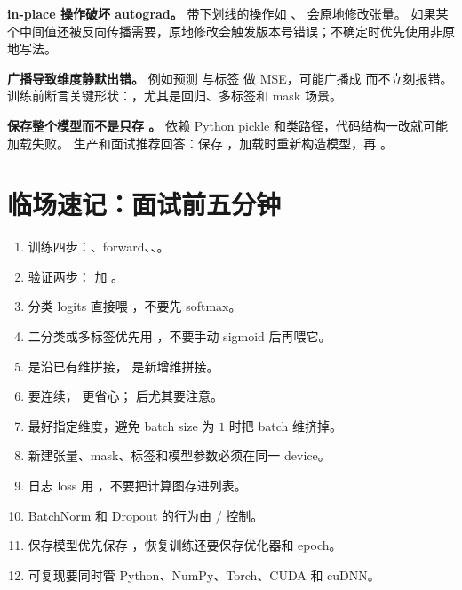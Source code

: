 \begin{trap}
\textbf{in-place 操作破坏 autograd。}
带下划线的操作如 、 会原地修改张量。
如果某个中间值还被反向传播需要，原地修改会触发版本号错误；不确定时优先使用非原地写法。
\end{trap}

\begin{trap}
\textbf{广播导致维度静默出错。}
例如预测 \code{[N,1]} 与标签 \code{[N]} 做 MSE，可能广播成 \code{[N,N]} 而不立刻报错。
训练前断言关键形状：，尤其是回归、多标签和 mask 场景。
\end{trap}

\begin{trap}
\textbf{保存整个模型而不是只存 。}
 依赖 Python pickle 和类路径，代码结构一改就可能加载失败。
生产和面试推荐回答：保存 ，加载时重新构造模型，再 。
\end{trap}

\section{临场速记：面试前五分钟}

\begin{enumerate}
\item 训练四步：、forward、、。
\item 验证两步： 加 。
\item 分类 logits 直接喂 ，不要先 softmax。
\item 二分类或多标签优先用 ，不要手动 sigmoid 后再喂它。
\item {} 是沿已有维拼接， 是新增维拼接。
\item {} 要连续， 更省心； 后尤其要注意。
\item {} 最好指定维度，避免 batch size 为 $1$ 时把 batch 维挤掉。
\item 新建张量、mask、标签和模型参数必须在同一 device。
\item 日志 loss 用 ，不要把计算图存进列表。
\item BatchNorm 和 Dropout 的行为由  /  控制。
\item 保存模型优先保存 ，恢复训练还要保存优化器和 epoch。
\item 可复现要同时管 Python、NumPy、Torch、CUDA 和 cuDNN。
\end{enumerate}

